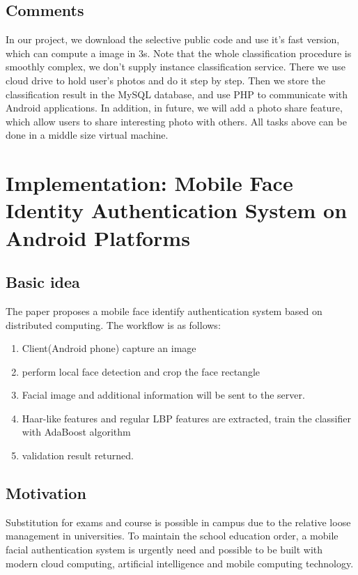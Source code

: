 \documentclass[a4paper]{article}
\begin{document}
      \subsection{Comments}  
        In our project, we download the  selective public code and use it's fast version, which can compute a image in 3s. Note that the whole classification procedure is smoothly complex, we don't supply instance classification service. There we use cloud drive to hold user's photos and do it step by step. Then we store the classification result in the MySQL database, and use PHP to communicate with Android applications. In addition, in future, we will add a photo share feature, which allow users to share interesting photo with others. All tasks above can be done in a middle size virtual machine.    

    \section{Implementation: Mobile Face Identity Authentication System on Android Platforms}
    \subsection{Basic idea}
        The paper proposes a mobile face identify authentication system based on distributed computing. The workflow is as follows:
        \begin{enumerate}
          \item Client(Android phone) capture an image
          \item perform local face detection and crop the face rectangle
          \item Facial image and additional information will be sent to the server.
          \item Haar-like features and regular LBP features are extracted, train the classifier with AdaBoost algorithm
          \item validation result returned.
        \end{enumerate}
    \subsection{Motivation}
      Substitution for exams and course is possible in campus due to the relative loose management in universities. To maintain the school education order, a mobile facial authentication system is urgently need and possible to be built with modern cloud computing, artificial intelligence and mobile computing technology.
\end{document}
